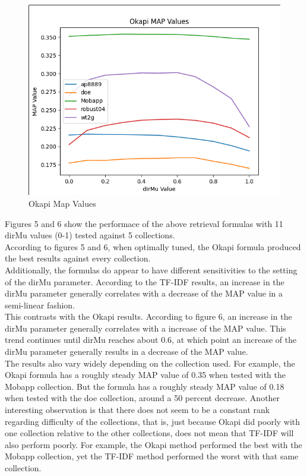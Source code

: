\documentclass{article}
\begin{document}
\begin{figure}[h!]
\centering
\includegraphics[scale=0.35]{OKAPI_MAP_VALUES.png}
\caption{Okapi Map Values}
\end{figure}

Figures 5 and 6 show the performace of the above retrieval formulas with 11 dirMu values (0-1) tested against 5 collections.\\
\newline According to figures 5 and 6, when optimally tuned, the Okapi formula produced the best results against every collection.\\
\newline Additionally, the formulas do appear to have different sensitivities to the setting of the dirMu parameter.  According to the TF-IDF results, an increase in the dirMu parameter generally correlates with a decrease of the MAP value in a semi-linear fashion.\\
\newline This contrasts with the Okapi results.  According to figure 6, an increase in the dirMu parameter generally correlates with a increase of the MAP value.  This trend continues until dirMu reaches about 0.6, at which point an increase of the dirMu parameter generally results in a decrease of the MAP value.\\
\newline The results also vary widely depending on the collection used.  For example, the Okapi formula has a roughly steady MAP value of 0.35 when tested with the Mobapp collection.  But the formula has a roughly steady MAP value of 0.18 when tested with the doe collection, around a 50 percent decrease.  Another interesting observation is that there does not seem to be a constant rank regarding difficulty of the collections, that is, just because Okapi did poorly with one collection relative to the other collections, does not mean that TF-IDF will also perform poorly.  For example, the Okapi method performed the best with the Mobapp collection, yet the TF-IDF method performed the worst with that same collection.\\
\clearpage
\end{document}
